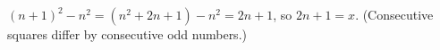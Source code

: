 $(n+1)^2-n^2=(n^2+2n+1)-n^2=2n+1$, so $2n+1=\boxed{x}$. (Consecutive squares differ by consecutive odd numbers.)
